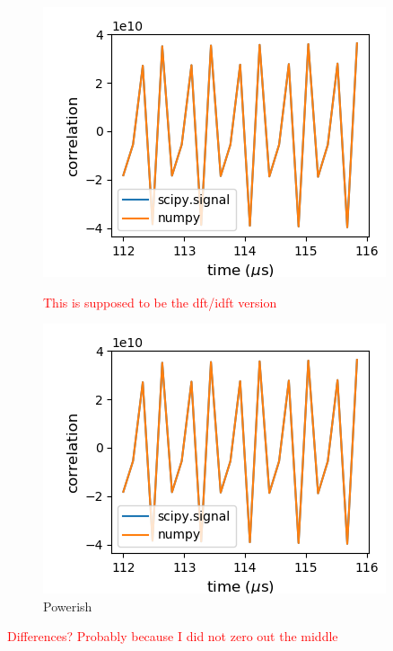 \documentclass[a4paper]{article}
\begin{document}
\begin{figure}
\centering
\begin{minipage}{.5\textwidth}
	\centering
	\includegraphics[width=.8\linewidth]{5-3/ACF}
	\caption{\textcolor{red}{This is supposed to be the dft/idft version}}
	\label{fig:inverse}
\end{minipage}%
\begin{minipage}{.5\textwidth}
	\centering
	\includegraphics[width=.8\linewidth]{5-3/ACF}
	\caption{Powerish}
	\label{fig:ACF}
\end{minipage}
\end{figure}

\textcolor{red}{Differences? Probably because I did not zero out the middle}

\end{document}
